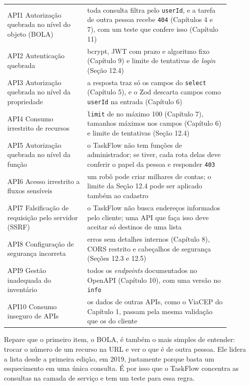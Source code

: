 \begin{center}
\begin{tabular}{@{}P{0.32\linewidth}P{0.58\linewidth}@{}}
\toprule
{}
 &  \\
\midrule
API1 Autorização quebrada no nível do objeto (BOLA) & toda consulta filtra pelo \texttt{userId}, e a tarefa de outra pessoa recebe \texttt{404} (Capítulos 4 e 7), com um teste que confere isso (Capítulo 11) \\
 API2 Autenticação quebrada & bcrypt, JWT com prazo e algoritmo fixo (Capítulo 9) e limite de tentativas de \textit{login} (Seção 12.4) \\
API3 Autorização quebrada no nível da propriedade & a resposta traz só os campos do \texttt{select} (Capítulo 5), e o Zod descarta campos como \texttt{userId} na entrada (Capítulo 6) \\
 API4 Consumo irrestrito de recursos & \texttt{limit} de no máximo 100 (Capítulo 7), tamanhos máximos nos campos (Capítulo 6) e limite de tentativas (Seção 12.4) \\
API5 Autorização quebrada no nível da função & o TaskFlow não tem funções de administrador; se tiver, cada rota delas deve conferir o papel da pessoa e responder \texttt{403} \\
 API6 Acesso irrestrito a fluxos sensíveis & um robô pode criar milhares de contas; o limite da Seção 12.4 pode ser aplicado também ao cadastro \\
API7 Falsificação de requisição pelo servidor (SSRF) & o TaskFlow não busca endereços informados pelo cliente; uma API que faça isso deve aceitar só destinos de uma lista \\
 API8 Configuração de segurança incorreta & erros sem detalhes internos (Capítulo 8), CORS restrito e cabeçalhos de segurança (Seções 12.3 e 12.5) \\
API9 Gestão inadequada do inventário & todos os \textit{endpoints} documentados no OpenAPI (Capítulo 10), com uma versão no \texttt{info} \\
 API10 Consumo inseguro de APIs & os dados de outras APIs, como o ViaCEP do Capítulo 1, passam pela mesma validação que os do cliente \\
\bottomrule
\end{tabular}
\end{center}

Repare que o primeiro item, o BOLA, é também o mais simples de entender: trocar o número de um recurso na URL e ver o que é de outra pessoa. Ele lidera a lista desde a primeira edição, em 2019, justamente porque basta um esquecimento em uma única consulta. É por isso que o TaskFlow concentra as consultas na camada de serviço e tem um teste para essa regra.

